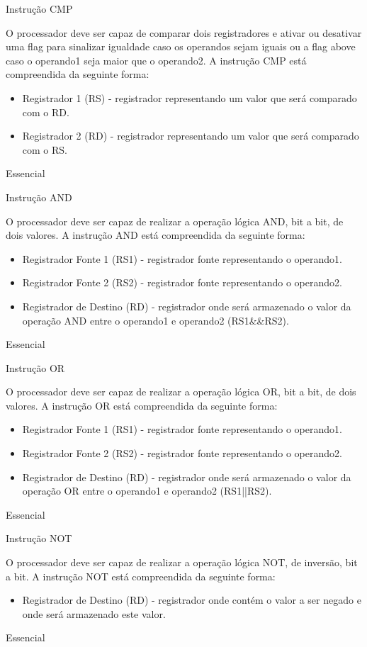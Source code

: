 \documentclass{article}
\begin{document}
\begin{functional}
     \requirement
      {Instrução CMP}
      {O processador deve ser capaz de comparar dois registradores e ativar ou desativar uma flag para sinalizar igualdade caso os operandos sejam iguais ou a flag above caso o operando1 seja maior que o operando2.
      A instrução CMP está compreendida da seguinte forma:\\
      \begin{itemize}
       \item Registrador 1 (RS) - registrador representando um valor que será comparado com o RD.
       \item Registrador 2 (RD) - registrador representando um valor que será comparado com o RS.
      \end{itemize}
      }
      {Essencial}

      \requirement
      {Instrução AND}
      {O processador deve ser capaz de realizar a operação lógica AND, bit a bit, de dois valores.
      A instrução AND está compreendida da seguinte forma:\\
       \begin{itemize}
        \item Registrador Fonte 1 (RS1) - registrador fonte representando o operando1.
        \item Registrador Fonte 2 (RS2) - registrador fonte representando o operando2.
        \item Registrador de Destino (RD) - registrador onde será armazenado o valor da operação AND entre o operando1 e operando2 (RS1\&\&RS2).
       \end{itemize}
       }
      {Essencial}

      \requirement
      {Instrução OR}
      {O processador deve ser capaz de realizar a operação lógica OR, bit a bit, de dois valores.
      A instrução OR está compreendida da seguinte forma:\\
       \begin{itemize}
        \item Registrador Fonte 1 (RS1) - registrador fonte representando o operando1.
        \item Registrador Fonte 2 (RS2) - registrador fonte representando o operando2.
        \item Registrador de Destino (RD) - registrador onde será armazenado o valor da operação OR entre o operando1 e operando2 (RS1||RS2).
       \end{itemize}
       }
      {Essencial}

      \requirement
      {Instrução NOT}
      {O processador deve ser capaz de realizar a operação lógica NOT, de inversão, bit a bit.
      A instrução NOT está compreendida da seguinte forma:\\
       \begin{itemize}
         \item Registrador de Destino (RD) - registrador onde contém o valor a ser negado e onde será armazenado este valor.
         \end{itemize}
         }
      {Essencial}
      

\end{functional}
\end{document}
